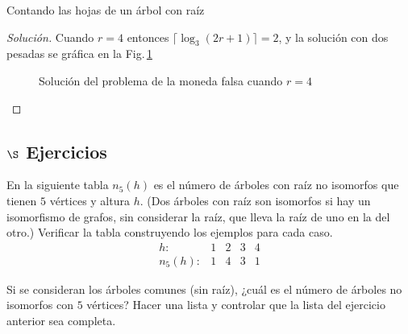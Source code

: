 \begin{section}{Contando las hojas de un árbol con raíz}
\begin{proof}[Solución]
Cuando $r=4$ entonces $\lceil \log_3(2r+1)\rceil=2$, y la solución con dos pesadas se gráfica en la Fig.\-\,\ref{f6.2}

\begin{figure}[ht]
    \begin{center}
    \end{center}
    \caption{Solución del problema de la moneda falsa cuando $r=4$}
    \label{f6.2}
\end{figure}

\end{proof}

\subsection*{$\S$ Ejercicios}
\begin{enumex}
\item En la siguiente tabla $n_5(h)$ es el número de árboles con raíz no isomorfos que tienen $5$ vértices y altura $h$. (Dos árboles con raíz son isomorfos si hay un isomorfismo de grafos, sin considerar la raíz, que lleva la raíz de uno en la del otro.) Verificar la tabla construyendo los ejemplos para cada caso.
$$
\begin{matrix}
h: &1 &2 &3 &4 \\
n_5(h): &1 &4 & 3 &1
\end{matrix}
$$
\item Si se consideran los árboles comunes (sin raíz), ¿cuál es el número de árboles no isomorfos con $5$ vértices? Hacer una lista y controlar que la lista del ejercicio anterior sea completa.


\end{enumex}
\end{section}
